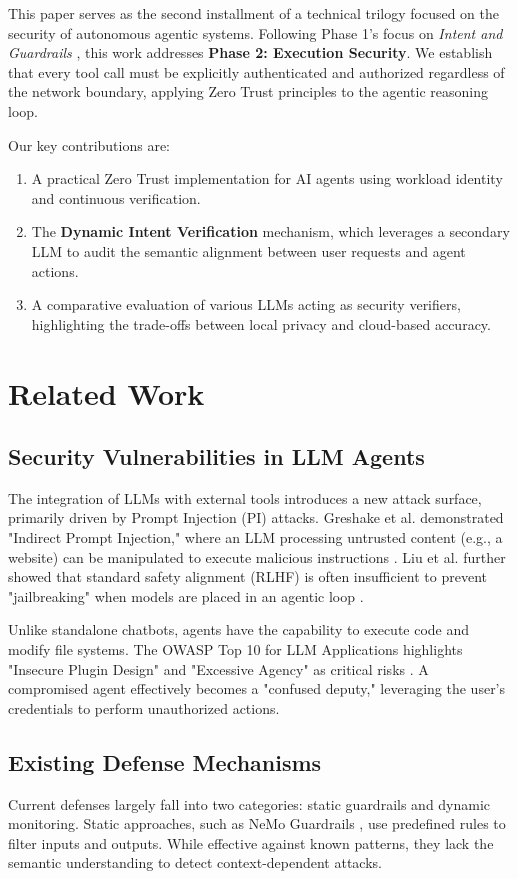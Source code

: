 \documentclass[conference]{IEEEtran}
\begin{document}
This paper serves as the second installment of a technical trilogy focused on the security of autonomous agentic systems. Following Phase 1's focus on \textit{Intent and Guardrails} \cite{ando2026_guardrail}, this work addresses \textbf{Phase 2: Execution Security}. We establish that every tool call must be explicitly authenticated and authorized regardless of the network boundary, applying Zero Trust principles to the agentic reasoning loop.

Our key contributions are:
\begin{enumerate}
    \item A practical Zero Trust implementation for AI agents using workload identity and continuous verification.
    \item The \textbf{Dynamic Intent Verification} mechanism, which leverages a secondary LLM to audit the semantic alignment between user requests and agent actions.
    \item A comparative evaluation of various LLMs acting as security verifiers, highlighting the trade-offs between local privacy and cloud-based accuracy.
\end{enumerate}

\section{Related Work}

\subsection{Security Vulnerabilities in LLM Agents}
The integration of LLMs with external tools introduces a new attack surface, primarily driven by Prompt Injection (PI) attacks. Greshake et al. demonstrated "Indirect Prompt Injection," where an LLM processing untrusted content (e.g., a website) can be manipulated to execute malicious instructions \cite{greshake2023}. Liu et al. further showed that standard safety alignment (RLHF) is often insufficient to prevent "jailbreaking" when models are placed in an agentic loop \cite{liu2023}.

Unlike standalone chatbots, agents have the capability to execute code and modify file systems. The OWASP Top 10 for LLM Applications highlights "Insecure Plugin Design" and "Excessive Agency" as critical risks \cite{owasp2023}. A compromised agent effectively becomes a "confused deputy," leveraging the user's credentials to perform unauthorized actions.

\subsection{Existing Defense Mechanisms}
Current defenses largely fall into two categories: static guardrails and dynamic monitoring.
Static approaches, such as NeMo Guardrails \cite{nemo}, use predefined rules to filter inputs and outputs. While effective against known patterns, they lack the semantic understanding to detect context-dependent attacks.
\end{document}
